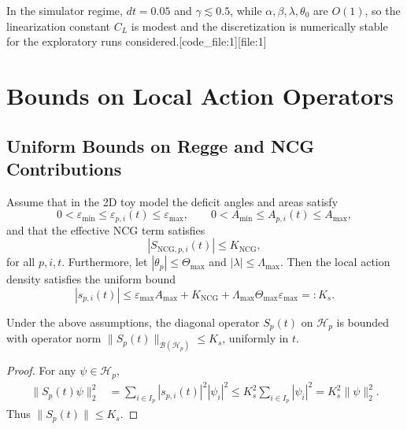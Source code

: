 \documentclass[11pt]{article}
\begin{document}
In the simulator regime, \(dt = 0.05\) and \(\gamma \lesssim 0.5\), while
\(\alpha,\beta,\lambda,\theta_0\) are \(O(1)\), so the linearization
constant \(C_L\) is modest and the discretization is numerically stable
for the exploratory runs considered.[code_file:1][file:1]

\section{Bounds on Local Action Operators}

\subsection{Uniform Bounds on Regge and NCG Contributions}

Assume that in the 2D toy model the deficit angles and areas satisfy
\begin{equation}
  0 < \varepsilon_{\min} \leq \varepsilon_{p,i}(t) \leq \varepsilon_{\max},
  \qquad
  0 < A_{\min} \leq A_{p,i}(t) \leq A_{\max},
\end{equation}
and that the effective NCG term satisfies
\begin{equation}
  |S_{\mathrm{NCG},p,i}(t)| \leq K_{\mathrm{NCG}},
\end{equation}
for all \(p,i,t\). Furthermore, let \(|\theta_p| \leq \Theta_{\max}\) and
\(|\lambda| \leq \Lambda_{\max}\). Then the local action density satisfies
the uniform bound
\begin{equation}
  |s_{p,i}(t)|
    \leq \varepsilon_{\max} A_{\max}
         + K_{\mathrm{NCG}}
         + \Lambda_{\max} \Theta_{\max} \varepsilon_{\max}
    =: K_s.
\end{equation}

\begin{lemma}[Boundedness of \(S_p(t)\)]
Under the above assumptions, the diagonal operator \(S_p(t)\) on
\(\mathcal{H}_p\) is bounded with operator norm
\(
  \|S_p(t)\|_{\mathcal{B}(\mathcal{H}_p)} \leq K_s
\),
uniformly in \(t\).
\end{lemma}

\begin{proof}
For any \(\psi \in \mathcal{H}_p\),
\begin{align*}
  \|S_p(t)\psi\|_2^2
    &= \sum_{i \in I_p} |s_{p,i}(t)|^2 |\psi_i|^2
     \leq K_s^2 \sum_{i \in I_p} |\psi_i|^2
     = K_s^2 \|\psi\|_2^2.
\end{align*}
Thus \(\|S_p(t)\| \leq K_s\).
\end{proof}
\end{document}
